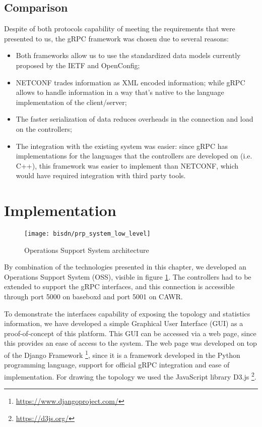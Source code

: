 \subsection{Comparison}

\par Despite of both protocols capability of meeting the requirements that were presented to us, the gRPC framework was chosen due to several reasons:

\begin {itemize}
    \item Both frameworks allow us to use the standardized data models currently proposed by the IETF and OpenConfig;
    \item NETCONF trades information as XML encoded information; while gRPC allows to handle information in a way that’s native to the language implementation 
        of the client/server;
    \item The faster serialization of data reduces overheads in the connection and load on the controllers;
    \item The integration with the existing system was easier: since gRPC has implementations for the languages that the controllers are developed on
        (i.e. C++), this framework was easier to implement than NETCONF, which would have required integration with third party tools.
\end {itemize}

\section {Implementation}

\begin{figure}
    \centering
    \texttt{[image: bisdn/prp\_system\_low\_level]}
    \caption{Operations Support System architecture}
    \label{fig:oss}
\end{figure}

By combination of the technologies presented in this chapter, we developed an Operations Support System (OSS), visible in figure \ref{fig:oss}. The controllers
had to be extended to support the gRPC interfaces, and this connection is accessible through port 5000 on baseboxd and port 5001 on CAWR.

\par To demonstrate the interfaces capability of exposing the topology and statistics information, we have developed a simple Graphical User Interface (GUI) as a 
proof-of-concept of this platform. This GUI can be accessed via a web page, since this provides an ease of access to the system.  The web page was developed on top
of the Django Framework \footnote{\url{https://www.djangoproject.com/}}, since it is a framework developed in the Python programming language, support for official 
gRPC integration and ease of implementation. For drawing the topology we used the JavaScript library D3.js \footnote{\url{https://d3js.org/}}.

